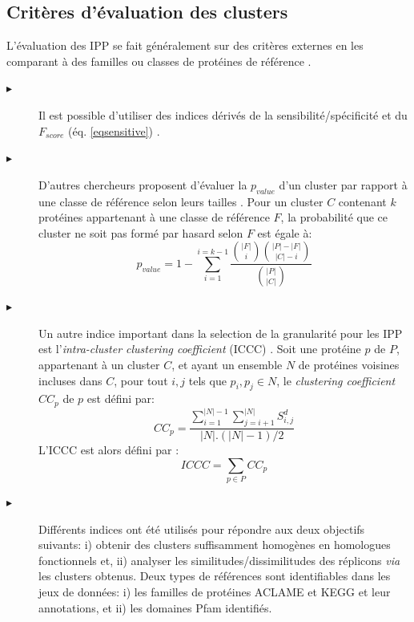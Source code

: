 \subsection{Critères d'évaluation des clusters}
      L'évaluation des IPP se fait généralement sur des critères externes en les comparant à des familles ou classes de protéines de référence \citep{nepusz2012detecting}. 
\begin{description}
\item[$\blacktriangleright$] Il est possible d'utiliser des indices dérivés de la sensibilité/spécificité et du $F_{score}$ (éq. \ref{eqsensitive}) \citep{Brohee2006}.
\item[$\blacktriangleright$] D'autres chercheurs proposent d'évaluer la $p_{value}$ d'un cluster par rapport à une classe de référence selon leurs tailles \citep{li2010computational}. Pour un cluster $C$ contenant $k$ protéines appartenant à une classe de référence $F$, la probabilité que ce cluster ne soit pas formé par hasard selon $F$ est égale à:
      \begin{equation}\label{pvalue}
        p_{value}=1-\sum_{i=1}^{i=k-1}{\frac{ {|F| \choose i}{|P|-|F| \choose |C|-i} } {{|P| \choose |C|}}} 
      \end{equation}
\item[$\blacktriangleright$] Un autre indice important dans la selection de la granularité pour les IPP est l'\textit{intra-cluster clustering coefficient} (ICCC) \citep{Lima-Mendez2008,VanHoudt2012}. Soit une protéine $p$ de $P$, appartenant à un cluster $C$, et ayant un ensemble $N$ de protéines voisines incluses dans $C$, pour tout $i,j$ tels que $p_{i},p_{j} \in N$, le \textit{clustering coefficient} $CC_{p}$ de $p$ est défini par:
      \begin{equation}\label{ccv}
      	CC_{p}=\frac{\sum_{i=1}^{|N|-1}\sum_{j=i+1}^{|N|}S^{d}_{i,j} }{|N|.(|N|-1)/2}
      \end{equation}
L'ICCC est alors défini par : 
      \begin{equation}
      	ICCC = \sum_{p \in P}CC_{p}
      \end{equation}
\item[$\blacktriangleright$] Différents indices ont été utilisés pour répondre aux deux objectifs suivants: i) obtenir des clusters suffisamment homogènes en homologues fonctionnels et, ii) analyser les similitudes/dissimilitudes des réplicons \textit{via} les clusters obtenus. Deux types de références sont identifiables dans les jeux de données: i) les familles de protéines ACLAME et KEGG et leur annotations, et ii) les domaines Pfam identifiés.\\

\end{description}
